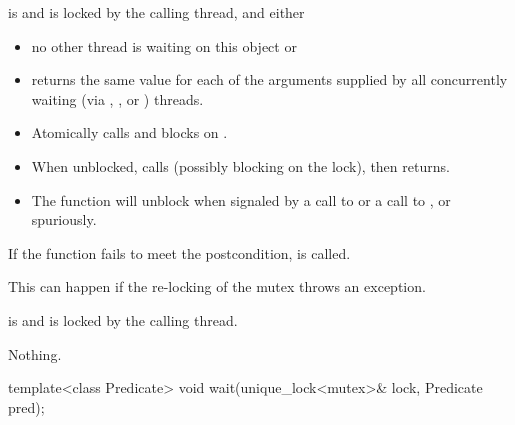 \begin{itemdescr}
\pnum
\expects
{} is  and 
is locked by the calling thread, and either
\begin{itemize}
\item no other thread is waiting on this  object or
\item {} returns the same value for each of the 
arguments supplied by all concurrently waiting (via ,
, or ) threads.
\end{itemize}

\pnum
{}%
\effects
\begin{itemize}
\item Atomically calls  and blocks on .
\item When unblocked, calls  (possibly blocking on the lock), then returns.
\item The function will unblock when signaled by a call to 
or a call to , or spuriously.
\end{itemize}

\pnum
\remarks
If the function fails to meet the postcondition, 
is called.
\begin{note}
This can happen if the re-locking of the mutex throws an exception.
\end{note}

\pnum
\ensures
{} is  and 
is locked by the calling thread.

\pnum
\throws
Nothing.
\end{itemdescr}

%
\begin{itemdecl}
template<class Predicate>
  void wait(unique_lock<mutex>& lock, Predicate pred);
\end{itemdecl}

